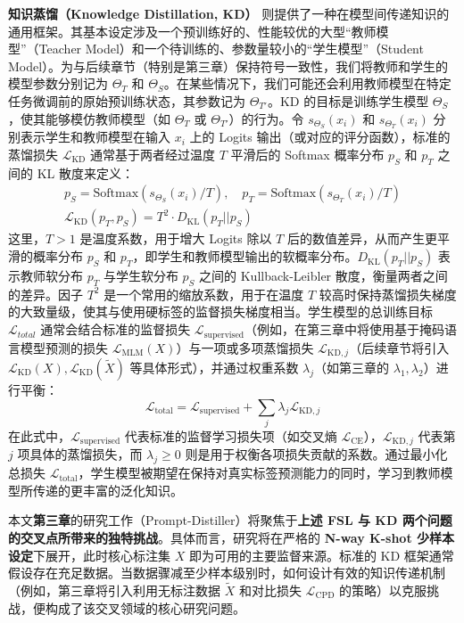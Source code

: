 \documentclass[../main.tex]{subfiles}
\begin{document}
\textbf{知识蒸馏（Knowledge Distillation, KD）} 则提供了一种在模型间传递知识的通用框架。其基本设定涉及一个预训练好的、性能较优的大型“教师模型”（Teacher Model）和一个待训练的、参数量较小的“学生模型”（Student Model）。为与后续章节（特别是第三章）保持符号一致性，我们将教师和学生的模型参数分别记为 $\Theta_T$ 和 $\Theta_S$。在某些情况下，我们可能还会利用教师模型在特定任务微调前的原始预训练状态，其参数记为 $\Theta_{T'}$。KD 的目标是训练学生模型 $\Theta_S$，使其能够模仿教师模型（如 $\Theta_T$ 或 $\Theta_{T'}$）的行为。令 $s_{\Theta_S}(x_i)$ 和 $s_{\Theta_T}(x_i)$ 分别表示学生和教师模型在输入 $x_i$ 上的 Logits 输出（或对应的评分函数），标准的蒸馏损失 $\mathcal{L}_\mathrm{KD}$ 通常基于两者经过温度 $T$ 平滑后的 Softmax 概率分布 $p_S$ 和 $p_T$ 之间的 KL 散度来定义：
\begin{gather}
	p_S = \text{Softmax}(s_{\Theta_S}(x_i)/T), \quad p_T = \text{Softmax}(s_{\Theta_T}(x_i)/T) \label{eq:kd_softmax} \\
	\mathcal{L}_\mathrm{KD}(p_T, p_S) = T^2 \cdot D_\mathrm{KL}(p_T || p_S) \label{eq:kd_loss}
\end{gather}
这里，$T > 1$ 是温度系数，用于增大 Logits 除以 $T$ 后的数值差异，从而产生更平滑的概率分布 $p_S$ 和 $p_T$，即学生和教师模型输出的软概率分布。$D_\mathrm{KL}(p_T || p_S)$ 表示教师软分布 $p_T$ 与学生软分布 $p_S$ 之间的 Kullback-Leibler 散度，衡量两者之间的差异。因子 $T^2$ 是一个常用的缩放系数，用于在温度 $T$ 较高时保持蒸馏损失梯度的大致量级，使其与使用硬标签的监督损失梯度相当。学生模型的总训练目标 $\mathcal{L}_{total}$ 通常会结合标准的监督损失 $\mathcal{L}_\mathrm{supervised}$（例如，在第三章中将使用基于掩码语言模型预测的损失 $\mathcal{L}_\mathrm{MLM}(X)$）与一项或多项蒸馏损失 $\mathcal{L}_{\mathrm{KD}, j}$（后续章节将引入 $\mathcal{L}_\mathrm{KD}(X), \mathcal{L}_\mathrm{KD}(\tilde{X})$ 等具体形式），并通过权重系数 $\lambda_j$（如第三章的 $\lambda_1, \lambda_2$）进行平衡：
\begin{equation}
	\mathcal{L}_\mathrm{total} = \mathcal{L}_\mathrm{supervised} + \sum_j \lambda_j \mathcal{L}_{\mathrm{KD}, j}
	\label{eq:kd_total_loss}
\end{equation}
在此式中，$\mathcal{L}_\mathrm{supervised}$ 代表标准的监督学习损失项（如交叉熵 $\mathcal{L}_\mathrm{CE}$），$\mathcal{L}_{\mathrm{KD}, j}$ 代表第 $j$ 项具体的蒸馏损失，而 $\lambda_j \ge 0$ 则是用于权衡各项损失贡献的系数。通过最小化总损失 $\mathcal{L}_\mathrm{total}$，学生模型被期望在保持对真实标签预测能力的同时，学习到教师模型所传递的更丰富的泛化知识。

本文\textbf{第三章}的研究工作（Prompt-Distiller）将聚焦于\textbf{上述 FSL 与 KD 两个问题的交叉点所带来的独特挑战}。具体而言，研究将在严格的 \textbf{N-way K-shot 少样本设定}下展开，此时核心标注集 $X$ 即为可用的主要监督来源。标准的 KD 框架通常假设存在充足数据。当数据骤减至少样本级别时，如何设计有效的知识传递机制（例如，第三章将引入利用无标注数据 $\tilde{X}$ 和对比损失 $\mathcal{L}_\mathrm{CPD}$ 的策略）以克服挑战，便构成了该交叉领域的核心研究问题。
\end{document}
